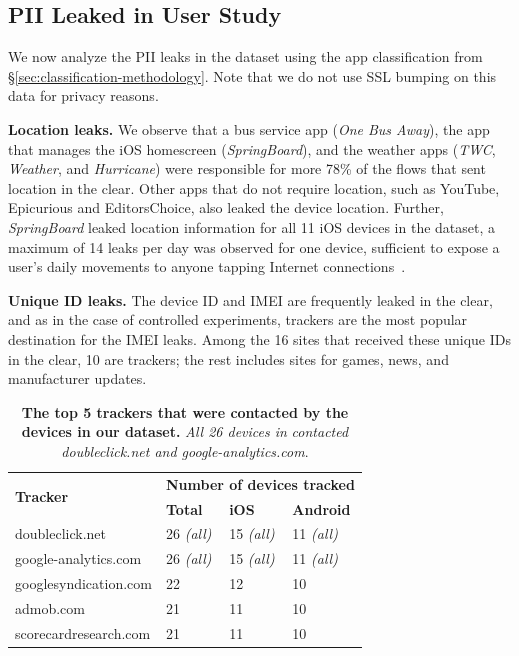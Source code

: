 \subsection{PII Leaked in User Study}

We now analyze the PII leaks in the \mobWild{} dataset using the app classification from \S\ref{sec:classification-methodology}. 
Note that we do not use SSL bumping on this data for privacy reasons. 

\noindent\textbf{Location leaks.}
We observe that a bus service app (\emph{One Bus Away}), the app that manages the iOS homescreen (\emph{SpringBoard}), and the weather apps (\emph{TWC}, \emph{Weather}, and \emph{Hurricane}) were responsible for more 78\% of the flows that sent location in the clear. 
Other apps that do not require location, such as YouTube, Epicurious and EditorsChoice, also leaked the device location. 
Further, \emph{SpringBoard} leaked location information for all 11 iOS devices in the \mobWild dataset, a maximum of 14 leaks per day was observed for one device, sufficient to expose a user's daily movements to anyone tapping Internet connections~\cite{nsa:globaltracking}. 

\noindent\textbf{Unique ID leaks.} 
The device ID and IMEI are frequently leaked in the clear, and as in the case of controlled experiments, trackers are the most popular destination for the IMEI leaks.  
Among the 16 sites that received these unique IDs in the clear, 10 are trackers; the rest includes sites for games, news, and manufacturer updates.

\begin{table}
\centering
\begin{small}
\begin{tabular}{|p{}|p{}|p{}|p{}|}
\hline
\multirow{2}{*}{\bf Tracker} & \multicolumn{3}{c|}{\bf Number of devices tracked}\tabularnewline
\cline{2-4}
                      &  {\bf Total} & {\bf iOS} & {\bf Android} \tabularnewline
\hline
doubleclick.net       & 26 {\em(all)} & 15 {\em(all)} & 11 {\em(all)} \tabularnewline
\hline
google-analytics.com  & 26 {\em(all)} & 15 {\em(all)}  & 11 {\em(all)} \tabularnewline
\hline
googlesyndication.com & 22 & 12 & 10 \tabularnewline
\hline
admob.com             & 21 & 11 & 10 \tabularnewline
\hline
scorecardresearch.com &  21 & 11 & 10 \tabularnewline
\hline
\end{tabular}
\end{small}
\caption{\textbf{The top 5 trackers that were contacted by the devices in our dataset.}
\emph{All 26 devices in} \mobWild \emph{contacted doubleclick.net and google-analytics.com}.}
\label{tab:top-trackers}
\vspace{\postfigspace}
\vspace{\postfigspace}
\end{table}

